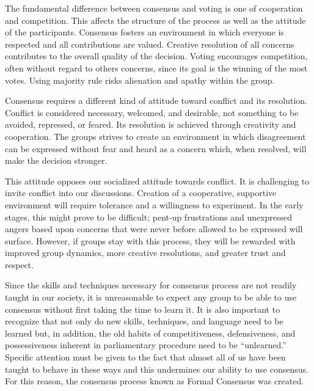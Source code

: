 %

The fundamental difference between consensus and voting is one of cooperation and competition. This affects the structure of the process as well as the attitude of the participants. Consensus fosters an environment in which everyone is respected and all contributions are valued. Creative resolution of all concerns contributes to the overall quality of the decision. Voting encourages competition, often without regard to others concerns, since its goal is the winning of the most votes. Using majority rule risks alienation and apathy within the group.

Consensus requires a different kind of attitude toward conflict and its resolution. Conflict is considered necessary, welcomed, and desirable, not something to be avoided, repressed, or feared. Its resolution is achieved through creativity and cooperation. The groups strives to create an environment in which disagreement can be expressed without fear and heard as a concern which, when resolved, will make the decision stronger.

This attitude opposes our socialized attitude towards conflict. It is challenging to invite conflict into our discussions. Creation of a cooperative, supportive environment will require tolerance and a willingness to experiment. In the early stages, this might prove to be difficult; pent-up frustrations and unexpressed angers based upon concerns that were never before allowed to be expressed will surface. However, if groups stay with this process, they will be rewarded with improved group dynamics, more creative resolutions, and greater trust and respect.

Since the skills and techniques necessary for consensus process are not readily taught in our society, it is unreasonable to expect any group to be able to use consensus without first taking the time to learn it. It is also important to recognize that not only do new skills, techniques, and language need to be learned but, in addition, the old habits of competitiveness, defensiveness, and possessiveness inherent in parliamentary procedure need to be ``unlearned.'' Specific attention must be given to the fact that almost all of us have been taught to behave in these ways and this undermines our ability to use consensus. For this reason, the consensus process known as Formal Consensus was created.

